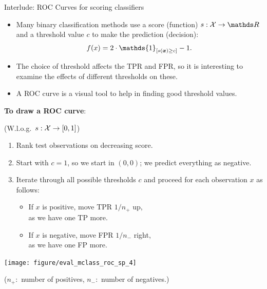 \begin{vbframe}{Interlude: ROC Curves for scoring classifiers}
	\small
	\begin{itemize}
%		
		\item 	Many binary classification methods use a score (function) $s:\Xspace \to \R$ and a threshold value $c$ to make the prediction (decision):
		$$\fx = 2 \cdot \mathds{1}_{[ s(\xv) \ge c]} -1.$$
		\item The choice of threshold affects the TPR and FPR, so it is interesting to examine the effects of different thresholds on these.
		
		\item A ROC curve is a visual tool to help in finding good threshold values.
%		
	\end{itemize}
	
	\framebreak
	
	
	\textbf{To draw a ROC curve}:
	
	(W.l.o.g.\ $s:\mathcal{X} \to [0,1]$)
	
	\lz
	
	\begin{minipage}[b]{0.65\textwidth}
		\small
		\begin{enumerate}
			\item Rank test observations on decreasing score.
			\item Start with $c = 1$, so we start in $(0, 0)$; we predict everything as
			negative.
			\item Iterate through all possible thresholds $c$ and proceed for each
			observation $x$ as follows:
			\begin{itemize}
				\footnotesize
				\item If $x$ is positive, move TPR $1/n_+$ up, \\as we have one TP more.
				\item If $x$ is negative, move FPR $1/n_-$ right, \\as we have one FP  more.
			\end{itemize}
		\end{enumerate}
	\end{minipage}%
	\begin{minipage}[b]{0.35\textwidth}
		\centering
		\texttt{[image: figure/eval\_mclass\_roc\_sp\_4]}
	\end{minipage}
	
	\scriptsize($n_+:$ number of positives, $n_-:$ number of negatives.)
\end{vbframe}


